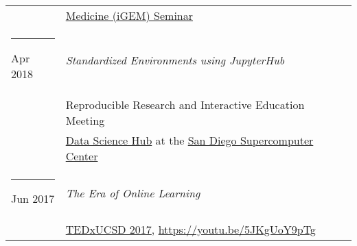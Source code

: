 \documentclass[margin,line]{res}
\begin{document}
\begin{resume}
\begin{longtable}{@{}p{0.7in}p{4in}}
\hspace*{-4mm} & \hspace{4mm} \href{http://igem.temple.edu/home}{Medicine (iGEM) Seminar}\\
\hspace*{-4mm} \rule{-1mm}{5mm} Apr 2018 & \textit{Standardized Environments using JupyterHub}\\*
\hspace*{-4mm} & \hspace{4mm} Reproducible Research and Interactive Education Meeting\\*
\hspace*{-4mm} & \hspace{4mm} \href{https://datascience.sdsc.edu/}{Data Science Hub} at the \href{https://www.sdsc.edu/}{San Diego Supercomputer Center}\\
\hspace*{-4mm} \rule{-1mm}{5mm} Jun 2017 & \textit{The Era of Online Learning}\\*
\hspace*{-4mm} & \hspace{4mm} \href{https://www.ted.com/tedx/events/22004}{TEDxUCSD 2017}, \href{https://youtu.be/5JKgUoY9pTg}{https://youtu.be/5JKgUoY9pTg}\\
\end{longtable}


\end{resume}
\end{document}
